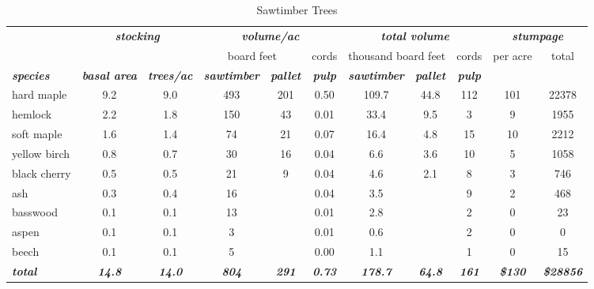 \documentclass[landscape]{article}
\begin{document}
\begin{table}[H]

\caption{\label{tab:unnamed-chunk-5}Sawtimber Trees}
\fontsize{10}{12}\selectfont
\begin{tabular}[t]{lcccccccccc}
\toprule
\multicolumn{1}{c}{\em{\textbf{ }}} & \multicolumn{2}{c}{\em{\textbf{stocking}}} & \multicolumn{3}{c}{\em{\textbf{volume/ac }}} & \multicolumn{3}{c}{\em{\textbf{total volume}}} & \multicolumn{2}{c}{\em{\textbf{stumpage}}} \\
\cmidrule(l{3pt}r{3pt}){2-3} \cmidrule(l{3pt}r{3pt}){4-6} \cmidrule(l{3pt}r{3pt}){7-9} \cmidrule(l{3pt}r{3pt}){10-11}
\multicolumn{3}{c}{ } & \multicolumn{2}{c}{board feet} & \multicolumn{1}{c}{cords} & \multicolumn{2}{c}{thousand board feet} & \multicolumn{1}{c}{cords} & \multicolumn{1}{c}{per acre} & \multicolumn{1}{c}{total} \\
\cmidrule(l{3pt}r{3pt}){4-5} \cmidrule(l{3pt}r{3pt}){6-6} \cmidrule(l{3pt}r{3pt}){7-8} \cmidrule(l{3pt}r{3pt}){9-9} \cmidrule(l{3pt}r{3pt}){10-10} \cmidrule(l{3pt}r{3pt}){11-11}
\rowcolor[HTML]{DCDCDC}  \em{\textbf{species}} & \em{\textbf{basal area}} & \em{\textbf{trees/ac}} & \em{\textbf{sawtimber}} & \em{\textbf{pallet}} & \em{\textbf{pulp}} & \em{\textbf{sawtimber}} & \em{\textbf{pallet}} & \em{\textbf{pulp}} & \em{\textbf{ }} & \em{\textbf{ }}\\
\midrule
\rowcolor{gray!6}  hard maple & 9.2 & 9.0 & 493 & 201 & 0.50 & 109.7 & 44.8 & 112 & 101 & 22378\\
 
hemlock & 2.2 & 1.8 & 150 & 43 & 0.01 & 33.4 & 9.5 & 3 & 9 & 1955\\
 
\rowcolor{gray!6}  soft maple & 1.6 & 1.4 & 74 & 21 & 0.07 & 16.4 & 4.8 & 15 & 10 & 2212\\
 
yellow birch & 0.8 & 0.7 & 30 & 16 & 0.04 & 6.6 & 3.6 & 10 & 5 & 1058\\
 
\rowcolor{gray!6}  black cherry & 0.5 & 0.5 & 21 & 9 & 0.04 & 4.6 & 2.1 & 8 & 3 & 746\\
 
ash & 0.3 & 0.4 & 16 &  & 0.04 & 3.5 &  & 9 & 2 & 468\\
 
\rowcolor{gray!6}  basswood & 0.1 & 0.1 & 13 &  & 0.01 & 2.8 &  & 2 & 0 & 23\\
 
aspen & 0.1 & 0.1 & 3 &  & 0.01 & 0.6 &  & 2 & 0 & 0\\
 
\rowcolor{gray!6}  beech & 0.1 & 0.1 & 5 &  & 0.00 & 1.1 &  & 1 & 0 & 15\\
 
\rowcolor[HTML]{DCDCDC}  \em{\textbf{total}} & \em{\textbf{14.8}} & \em{\textbf{14.0}} & \em{\textbf{804}} & \em{\textbf{291}} & \em{\textbf{0.73}} & \em{\textbf{178.7}} & \em{\textbf{64.8}} & \em{\textbf{161}} & \em{\textbf{\$130}} & \em{\textbf{\$28856}}\\
\bottomrule
\end{tabular}
\end{table}
\end{document}
